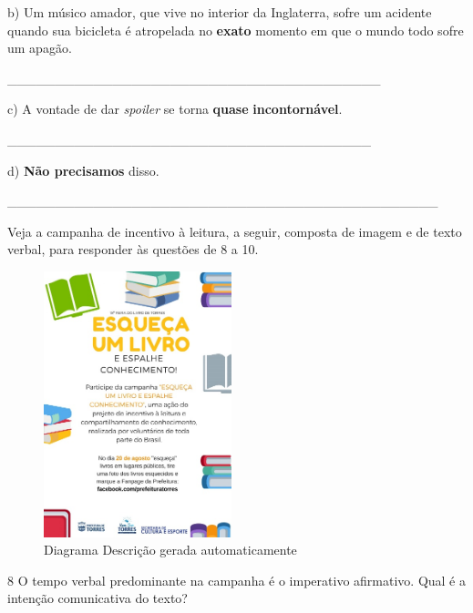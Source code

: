 b) Um músico amador, que vive no interior da Inglaterra, sofre um
acidente quando sua bicicleta é atropelada no \textbf{{exato}} momento
em que o mundo todo sofre um apagão.

\_\_\_\_\_\_\_\_\_\_\_\_\_\_\_\_\_\_\_\_\_\_\_\_\_\_\_\_\_\_\_\_\_\_\_\_\_\_\_

c) A vontade de dar \emph{spoiler} se torna \textbf{{quase}}
\textbf{{incontornável}}.

\_\_\_\_\_\_\_\_\_\_\_\_\_\_\_\_\_\_\_\_\_\_\_\_\_\_\_\_\_\_\_\_\_\_\_\_\_\_

d) \textbf{{Não precisamos}} disso.

\_\_\_\_\_\_\_\_\_\_\_\_\_\_\_\_\_\_\_\_\_\_\_\_\_\_\_\_\_\_\_\_\_\_\_\_\_\_\_\_\_\_\_\_\_


Veja a campanha de incentivo à leitura, a seguir, composta de imagem e
de texto verbal, para responder às questões de 8 a 10.

\begin{figure}
\centering
\includegraphics[width=2.14842in,height=3.03846in]{./imgSAEB_6_POR/media/image25.jpeg}
\caption{Diagrama Descrição gerada automaticamente}
\end{figure}


\num{8} O tempo verbal predominante na campanha é o imperativo
afirmativo. Qual é a intenção comunicativa do texto?



